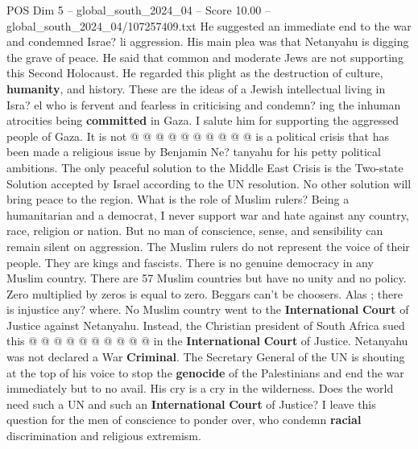 \begin{textsample}{POS Dim 5 – global\_south\_2024\_04 – Score 10.00 – global\_south\_2024\_04/107257409.txt}
He suggested an immediate end to the war and condemned Israe? li aggression.
His main plea was that Netanyahu is digging the grave of peace.
He said that common and moderate Jews are not supporting this Second Holocaust.
He regarded this plight as the destruction of culture, \textbf{humanity}, and history.
These are the ideas of a Jewish intellectual living in Isra? el who is fervent and fearless in criticising and condemn? ing the inhuman atrocities being \textbf{committed} in Gaza.
I salute him for supporting the aggressed people of Gaza.
It is not @ @ @ @ @ @ @ @ @ @ is a political crisis that has been made a religious issue by Benjamin Ne? tanyahu for his petty political ambitions.
The only peaceful solution to the Middle East Crisis is the Two-state Solution accepted by Israel according to the UN resolution.
No other solution will bring peace to the region.
What is the role of Muslim rulers?
Being a humanitarian and a democrat, I never support war and hate against any country, race, religion or nation.
But no man of conscience, sense, and sensibility can remain silent on aggression.
The Muslim rulers do not represent the voice of their people.
They are kings and fascists.
There is no genuine democracy in any Muslim country.
There are 57 Muslim countries but have no unity and no policy.
Zero multiplied by zeros is equal to zero.
Beggars can't be choosers.
Alas ; there is injustice any? where.
No Muslim country went to the \textbf{International} \textbf{Court} of Justice against Netanyahu.
Instead, the Christian president of South Africa sued this @ @ @ @ @ @ @ @ @ @ in the \textbf{International} \textbf{Court} of Justice.
Netanyahu was not declared a War \textbf{Criminal}.
The Secretary General of the UN is shouting at the top of his voice to stop the \textbf{genocide} of the Palestinians and end the war immediately but to no avail.
His cry is a cry in the wilderness.
Does the world need such a UN and such an \textbf{International} \textbf{Court} of Justice?
I leave this question for the men of conscience to ponder over, who condemn \textbf{racial} discrimination and religious extremism.

\end{textsample}
